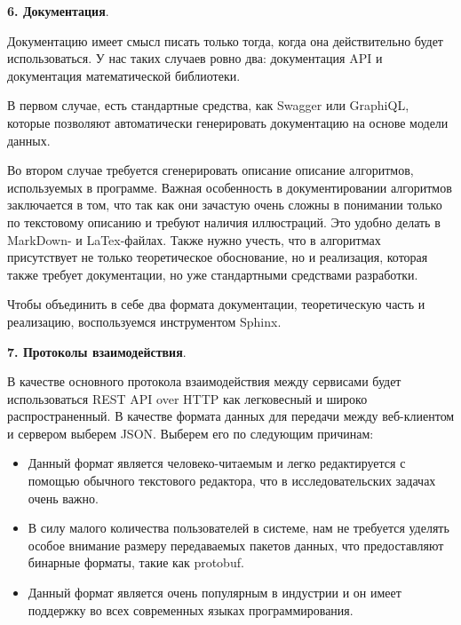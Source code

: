 \noindent \textbf{6. Документация}.

Документацию имеет смысл писать только тогда, когда она действительно будет использоваться.
У нас таких случаев ровно два: документация API и документация математической библиотеки.

В первом случае, есть стандартные средства, как Swagger или GraphiQL,
которые позволяют автоматически генерировать документацию на основе модели данных.

Во втором случае требуется сгенерировать описание описание алгоритмов, используемых в программе.
Важная особенность в документировании алгоритмов заключается в том, что так как они зачастую очень сложны
в понимании только по текстовому описанию и требуют наличия иллюстраций. Это удобно делать в MarkDown- и LaTex-файлах.
Также нужно учесть, что в алгоритмах присутствует не только теоретическое обоснование, но и реализация, которая также
требует документации, но уже стандартными средствами разработки.

Чтобы объединить в себе два формата документации, теоретическую часть и реализацию,
воспользуемся инструментом Sphinx\cite{Sphinx}.

\noindent \textbf{7. Протоколы взаимодействия}.

В качестве основного протокола взаимодействия между сервисами будет использоваться
REST API over HTTP как легковесный и широко распространенный.
В качестве формата данных для передачи между веб-клиентом и сервером выберем JSON. Выберем его по следующим причинам:
\begin{itemize}
    \item Данный формат является человеко-читаемым и легко редактируется с помощью обычного текстового редактора,
    что в исследовательских задачах очень важно.
    \item В силу малого количества пользователей в системе, нам не требуется уделять особое внимание размеру
    передаваемых пакетов данных, что предоставляют бинарные форматы, такие как protobuf\cite{Protobuf}.
    \item Данный формат является очень популярным в индустрии и он имеет поддержку
    во всех современных языках программирования.
\end{itemize}


